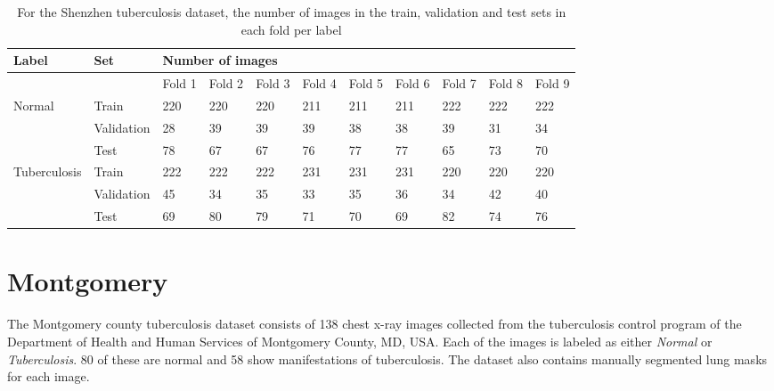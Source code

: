 \documentclass[12pt,oneside,a4paper]{report}
\begin{document}
\begin{landscape}
  \begin{table}[]
    \centering
    \begin{tabular}{@{}lllllllllll@{}}
      \toprule
      \textbf{Label}                & \textbf{Set} & \multicolumn{9}{l}{\textbf{Number of images}}                                                                        \\ \midrule
                                    &              & Fold 1    & Fold 2    & Fold 3    & Fold 4    & Fold 5    & Fold 6    & Fold 7    & Fold 8    & Fold 9        \\ \midrule
      \multirow{3}{*}{Normal}       & Train        & 220       & 220       & 220       & 211       & 211       & 211       & 222       & 222       & 222                 \\ \cmidrule(l){2-11} 
                                    & Validation   & 28        & 39        & 39        & 39        & 38        & 38        & 39        & 31        & 34                  \\ \cmidrule(l){2-11} 
                                    & Test         & 78        & 67        & 67        & 76        & 77        & 77        & 65        & 73        & 70                  \\ \midrule
      \multirow{3}{*}{Tuberculosis} & Train        & 222       & 222       & 222       & 231       & 231       & 231       & 220       & 220       & 220                 \\ \cmidrule(l){2-11} 
                                    & Validation   & 45        & 34        & 35        & 33        & 35        & 36        & 34        & 42        & 40                  \\ \cmidrule(l){2-11} 
                                    & Test         & 69        & 80        & 79        & 71        & 70        & 69        & 82        & 74        & 76                  \\ \bottomrule 
    \end{tabular}
    \caption{For the Shenzhen tuberculosis dataset, the number of images in the
      train, validation and test sets in each fold per label}
    \label{tab:shenzhen_split}
  \end{table}
\end{landscape}

\section{Montgomery\label{montgomery}}
The Montgomery county tuberculosis dataset consists of 138 chest x-ray images
collected from the tuberculosis control program of the Department of Health and
Human Services of Montgomery County, MD, USA. Each of the images is labeled as
either \emph{Normal} or \emph{Tuberculosis}. 80 of these are normal and 58 show manifestations of tuberculosis. The dataset also contains manually segmented lung masks for each image.\\
\end{document}

